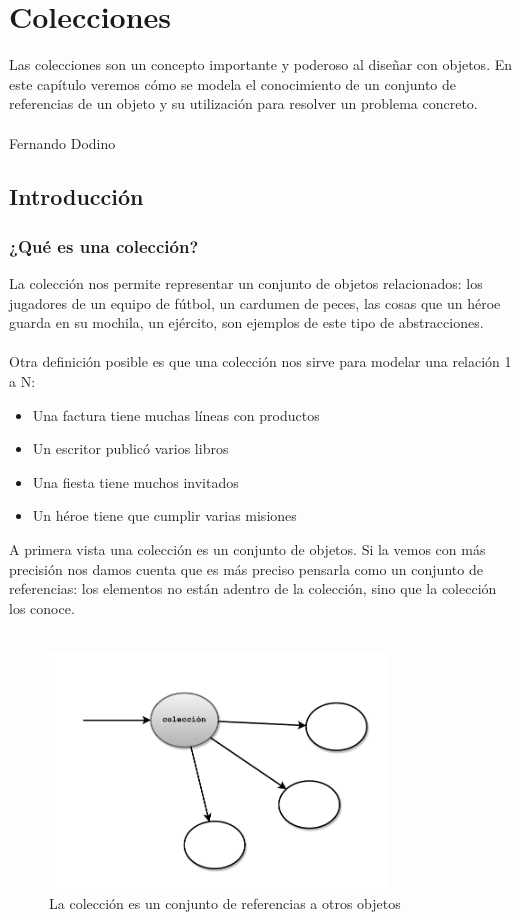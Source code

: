 \documentclass[a4paper,12pt]{book}
\begin{document}
\chapter{Colecciones}
Las colecciones son un concepto importante y poderoso al diseñar con objetos. En este capítulo veremos cómo
se modela el conocimiento de un conjunto de referencias de un objeto y su utilización para resolver un problema
concreto.
\\
\\
 \hfill Fernando Dodino

\tableofcontents

\section{Introducción}

\subsection{¿Qué es una colección?}
La colección nos permite representar un conjunto de objetos relacionados: los jugadores de un equipo de fútbol, 
un cardumen de peces, las cosas que un héroe guarda en su mochila, un ejército, son ejemplos de este
tipo de abstracciones.\\
\\
Otra definición posible es que una colección nos sirve para modelar una relación 1 a N:\\
\begin{itemize}
\item Una factura tiene muchas líneas con productos
\item Un escritor publicó varios libros
\item Una fiesta tiene muchos invitados
\item Un héroe tiene que cumplir varias misiones
\end{itemize}

A primera vista una colección es un conjunto de objetos. Si la vemos con más precisión nos damos cuenta que es más
preciso pensarla como un conjunto de referencias: los elementos no están adentro de la colección, sino que la
colección los conoce. 
\\
\\
\begin{figure}
    \centering
    \includegraphics[width=0.8\textwidth]{images/01_GraficoInicial_Colecciones.pdf}
    \caption{La colección es un conjunto de referencias a otros objetos}
\end{figure}
\\
\end{document}
